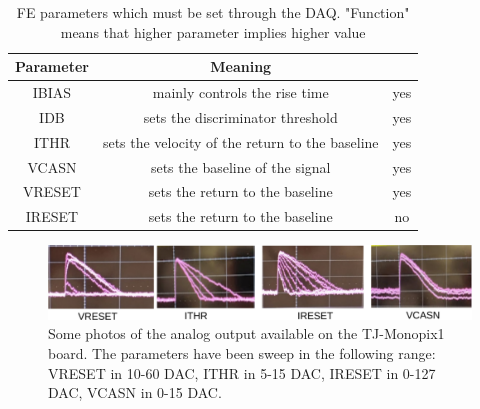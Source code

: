             \begin{table}
                \begin{center}
                \begin{tabular}{|c | c | c |}
                \hline
                Parameter & Meaning & \\
                \hline
                \hline
                IBIAS & mainly controls the rise time & yes\\
                IDB & sets the discriminator threshold & yes\\
                ITHR & sets the velocity of the return to the baseline & yes \\
                VCASN & sets the baseline of the signal & yes\\
                VRESET & sets the return to the baseline & yes\\
                IRESET & sets the return to the baseline & no\\
                \hline
                \end{tabular}
                \caption{FE parameters which must be set through the DAQ. "Function" means that higher parameter implies higher value}
                \label{tab:FE-parameters}
                \end{center}
            \end{table}
    

            \begin{figure}[h!]
                \centering
                \includegraphics[width=\linewidth]{figures/Monopix1/oscilloscopio.pdf}
                \caption{Some photos of the analog output available on the TJ-Monopix1 board. The parameters have been sweep in the following range: VRESET in 10-60 DAC, ITHR in 5-15 DAC, IRESET in 0-127 DAC, VCASN in 0-15 DAC.}
                \label{fig:oscilloscope}
            \end{figure}

